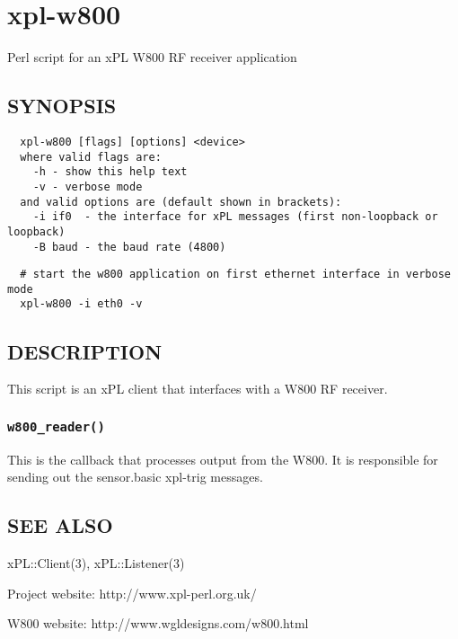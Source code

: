 \documentclass[12pt,a4paper]{article}
\begin{document}
\newpage
\section{xpl-w800\label{xpl-w800}}


Perl script for an xPL W800 RF receiver application

\subsection*{SYNOPSIS\label{xpl-w800_SYNOPSIS}}
\begin{verbatim}
  xpl-w800 [flags] [options] <device>
  where valid flags are:
    -h - show this help text
    -v - verbose mode
  and valid options are (default shown in brackets):
    -i if0  - the interface for xPL messages (first non-loopback or loopback)
    -B baud - the baud rate (4800)
\end{verbatim}
\begin{verbatim}
  # start the w800 application on first ethernet interface in verbose mode
  xpl-w800 -i eth0 -v
\end{verbatim}
\subsection*{DESCRIPTION\label{xpl-w800_DESCRIPTION}}


This script is an xPL client that interfaces with a W800 RF receiver.

\subsubsection*{\texttt{w800\_reader()}\label{xpl-w800_w800_reader_}}


This is the callback that processes output from the W800.  It is
responsible for sending out the sensor.basic xpl-trig messages.

\subsection*{SEE ALSO\label{xpl-w800_SEE_ALSO}}


xPL::Client(3), xPL::Listener(3)



Project website: http://www.xpl-perl.org.uk/



W800 website: http://www.wgldesigns.com/w800.html
\end{document}
